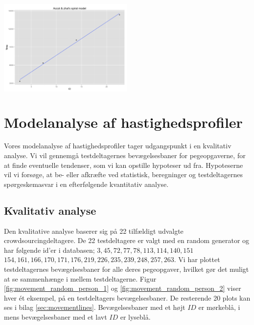 \begin{minipage}{\linewidth}
	\begin{minipage}[t]{\linewidth}
		\centering
		\includegraphics[width=0.5\textwidth]{images/plots/plot_model_spiral_accot}
		\label{fig:accot_spiral_line}
	\end{minipage}
\end{minipage}

\newpage
{}
\section*{Modelanalyse af hastighedsprofiler}
Vores modelanalyse af hastighedsprofiler tager udgangspunkt i en kvalitativ analyse. Vi vil gennemgå testdeltagernes bevægelsesbaner for pegeopgaverne, for at finde eventuelle tendenser, som vi kan opstille hypoteser ud fra. Hypoteserne vil vi forsøge, at be- eller afkræfte ved statistisk, beregninger og testdeltagernes spørgeskemasvar i en efterfølgende kvantitativ analyse.

\subsection*{Kvalitativ analyse}
Den kvalitative analyse baserer sig på 22 tilfældigt udvalgte crowdsourcingdeltagere. De 22 testdeltagere er valgt med en random generator og har følgende id'er i databasen; $3,45,72,77,78,113,114,140,151$ $154,161,166,170,171,176,219,226,235,239,248,257,263$. Vi har plottet testdeltagernes bevægelsesbaner for alle deres pegeopgaver, hvilket gør det muligt at se sammenhænge i mellem testdeltagerne. Figur \ref{fig:movement_random_person_1} og \ref{fig:movement_random_person_2} viser hver ét eksempel, på en testdeltagers bevægelsesbaner. De resterende 20 plots kan ses i bilag \ref{sec:movementlines}. Bevægelsesbaner med et højt $ID$ er mørkeblå, i mens bevægelsesbaner med et lavt $ID$ er lyseblå.

